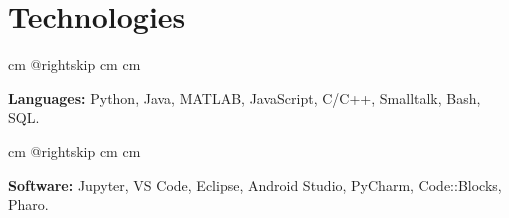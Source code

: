 \documentclass[10pt, letterpaper]{article}
\begin{document}
    
    \section{Technologies}

        \begingroup{} cm
        \advance\csname @rightskip cm
        \advance{} cm

        \textbf{Languages:} Python, Java, MATLAB, JavaScript, C/C++, Smalltalk, Bash, SQL. \par\endgroup

        \vspace{0.2 cm}
        \begingroup{} cm
        \advance\csname @rightskip cm
        \advance{} cm

        \textbf{Software:} Jupyter, VS Code, Eclipse, Android Studio, PyCharm, Code::Blocks, Pharo. \par\endgroup


    
\end{document}
